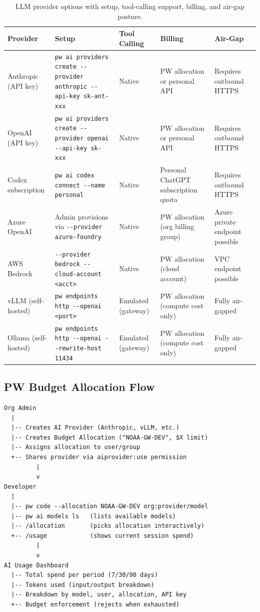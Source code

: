 \documentclass[11pt,letterpaper,twoside]{article}
\begin{document}
\begin{table}[H]
\centering
\small
\caption{LLM provider options with setup, tool-calling support, billing,
  and air-gap posture.}
\label{tab:providers}
\begin{tabularx}{\textwidth}{L{3.0cm} L{4.4cm} L{1.7cm} L{2.6cm} X}
\toprule
\textbf{Provider} & \textbf{Setup} & \textbf{Tool Calling} & \textbf{Billing} & \textbf{Air-Gap} \\
\midrule
Anthropic (API key)
& \texttt{pw ai providers create -{}-provider anthropic -{}-api-key sk-ant-xxx}
& Native
& PW allocation or personal API
& Requires outbound HTTPS \\
\addlinespace
OpenAI (API key)
& \texttt{pw ai providers create -{}-provider openai -{}-api-key sk-xxx}
& Native
& PW allocation or personal API
& Requires outbound HTTPS \\
\addlinespace
Codex subscription
& \texttt{pw ai codex connect -{}-name personal}
& Native
& Personal ChatGPT subscription quota
& Requires outbound HTTPS \\
\addlinespace
Azure OpenAI
& Admin provisions via \texttt{-{}-provider azure-foundry}
& Native
& PW allocation (org billing group)
& Azure private endpoint possible \\
\addlinespace
AWS Bedrock
& \texttt{-{}-provider bedrock -{}-cloud-account <acct>}
& Native
& PW allocation (cloud account)
& VPC endpoint possible \\
\addlinespace
vLLM (self-hosted)
& \texttt{pw endpoints http -{}-openai <port>}
& Emulated (gateway)
& PW allocation (compute cost only)
& Fully air-gapped \\
\addlinespace
Ollama (self-hosted)
& \texttt{pw endpoints http -{}-openai -{}-rewrite-host 11434}
& Emulated (gateway)
& PW allocation (compute cost only)
& Fully air-gapped \\
\bottomrule
\end{tabularx}
\end{table}

\subsection{PW Budget Allocation Flow}

\begin{lstlisting}[style=diagram]
Org Admin
  |
  |-- Creates AI Provider (Anthropic, vLLM, etc.)
  |-- Creates Budget Allocation ("NOAA-GW-DEV", $X limit)
  |-- Assigns allocation to user/group
  +-- Shares provider via aiprovider:use permission
         |
         v
Developer
  |
  |-- pw code --allocation NOAA-GW-DEV org:provider/model
  |-- pw ai models ls   (lists available models)
  |-- /allocation       (picks allocation interactively)
  +-- /usage            (shows current session spend)
         |
         v
AI Usage Dashboard
  |-- Total spend per period (7/30/90 days)
  |-- Tokens used (input/output breakdown)
  |-- Breakdown by model, user, allocation, API key
  +-- Budget enforcement (rejects when exhausted)
\end{lstlisting}
\end{document}

